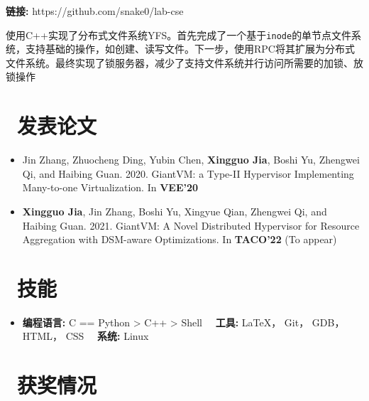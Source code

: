 \documentclass{resume}
\begin{document}
\textbf{链接:} https://github.com/snake0/lab-cse

使用C++实现了分布式文件系统YFS。首先完成了一个基于\texttt{inode}的单节点文件系统，支持基础的操作，如创建、读写文件。下一步，使用RPC将其扩展为分布式文件系统。最终实现了锁服务器，减少了支持文件系统并行访问所需要的加锁、放锁操作

\section{\faGraduationCap\ 发表论文}
\begin{itemize}
\item Jin Zhang, Zhuocheng Ding, Yubin Chen, \textbf{Xingguo Jia}, Boshi Yu, Zhengwei Qi, and Haibing Guan. 2020. GiantVM: a Type-II Hypervisor Implementing Many-to-one Virtualization. In \textbf{VEE'20}
\item \textbf{Xingguo Jia}, Jin Zhang, Boshi Yu, Xingyue Qian, Zhengwei Qi, and Haibing Guan. 2021. GiantVM: A Novel Distributed Hypervisor for Resource Aggregation with DSM-aware Optimizations. In \textbf{TACO'22} (To appear)
\end{itemize}


\section{\faCogs\ 技能}
\begin{itemize}[parsep=0.5ex]
  \item \textbf{编程语言:} C == Python > C++ > Shell \ \ \textbf{工具:} \LaTeX， Git， GDB， HTML， CSS \ \ \textbf{系统:} Linux 
\end{itemize}

\section{\faHeartO\ 获奖情况}

%
%
\end{document}
